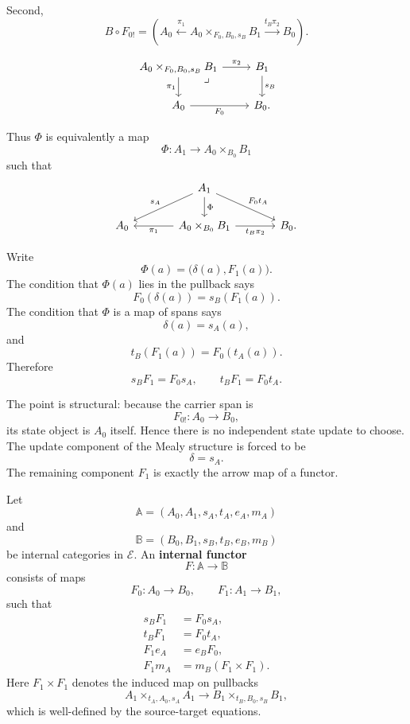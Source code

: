 Second,
\[
B\circ F_{0!}
=
\left(
A_0
\xleftarrow{\pi_1}
A_0\times_{F_0,B_0,s_B}B_1
\xrightarrow{t_B\pi_2}
B_0
\right).
\]

\[
\begin{tikzcd}
A_0\times_{F_0,B_0,s_B}B_1
\arrow[r, "\pi_2"]
\arrow[d, "\pi_1"']
\arrow[dr, phantom, "\lrcorner", very near start]
&
B_1 \arrow[d, "s_B"]
\\
A_0 \arrow[r, "F_0"'] & B_0.
\end{tikzcd}
\]

Thus \(\Phi\) is equivalently a map
\[
\Phi:A_1\to A_0\times_{B_0}B_1
\]
such that
\[
\begin{tikzcd}[column sep=large]
&
A_1
\arrow[dl, "s_A"']
\arrow[dr, "F_0t_A"]
\arrow[d, "\Phi"]
&
\\
A_0
&
A_0\times_{B_0}B_1
\arrow[l, "\pi_1"]
\arrow[r, "t_B\pi_2"']
&
B_0.
\end{tikzcd}
\]

Write
\[
\Phi(a)=\bigl(\delta(a),F_1(a)\bigr).
\]
The condition that \(\Phi(a)\) lies in the pullback says
\[
F_0(\delta(a))=s_B(F_1(a)).
\]
The condition that \(\Phi\) is a map of spans says
\[
\delta(a)=s_A(a),
\]
and
\[
t_B(F_1(a))=F_0(t_A(a)).
\]
Therefore
\[
s_BF_1=F_0s_A,
\qquad
t_BF_1=F_0t_A.
\]

The point is structural: because the carrier span is
\[
F_{0!}:A_0\to B_0,
\]
its state object is \(A_0\) itself. Hence there is no independent state update to choose. The update component of the Mealy structure is forced to be
\[
\delta=s_A.
\]
The remaining component \(F_1\) is exactly the arrow map of a functor.

\begin{definition}
\label{def:internal-functor}
Let
\[
\mathbb A=(A_0,A_1,s_A,t_A,e_A,m_A)
\]
and
\[
\mathbb B=(B_0,B_1,s_B,t_B,e_B,m_B)
\]
be internal categories in \(\mathcal E\). An \textbf{internal functor}
\[
F:\mathbb A\to\mathbb B
\]
consists of maps
\[
F_0:A_0\to B_0,
\qquad
F_1:A_1\to B_1,
\]
such that
\begin{align}
s_BF_1&=F_0s_A,
\label{eq:internal-functor-source}
\\
t_BF_1&=F_0t_A,
\label{eq:internal-functor-target}
\\
F_1e_A&=e_BF_0,
\label{eq:internal-functor-identity}
\\
F_1m_A&=m_B(F_1\times F_1).
\label{eq:internal-functor-composition}
\end{align}
Here \(F_1\times F_1\) denotes the induced map on pullbacks
\[
A_1\times_{t_A,A_0,s_A}A_1
\longrightarrow
B_1\times_{t_B,B_0,s_B}B_1,
\]
which is well-defined by the source-target equations.
\end{definition}

